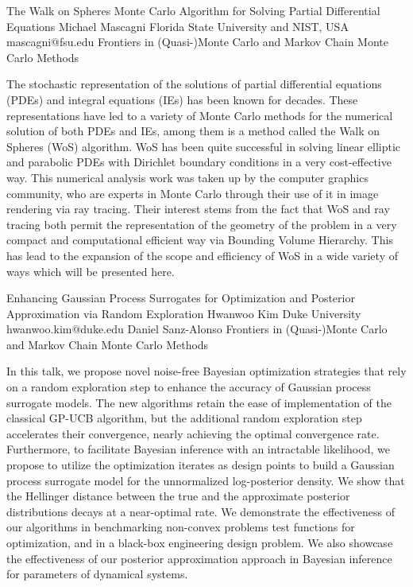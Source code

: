 \begin{talk}
  {The Walk on Spheres Monte Carlo Algorithm for Solving Partial Differential Equations}%
  {Michael Mascagni}%
  {Florida State University and NIST, USA}%
  {mascagni@fsu.edu}%
  {}%
  {Frontiers in (Quasi-)Monte Carlo and Markov Chain Monte Carlo Methods}%
    
   
The stochastic representation of the solutions of partial differential equations (PDEs) and integral equations (IEs) has been known for decades.  These representations have led to a variety of Monte Carlo methods for the numerical solution of both PDEs and IEs, among them is a method called the Walk on Spheres (WoS) algorithm.  WoS has been quite successful in solving linear elliptic and parabolic PDEs with Dirichlet boundary conditions in a very cost-effective way.  This numerical analysis work was taken up by the computer graphics community, who are experts in Monte Carlo through their use of it in image rendering via ray tracing.  Their interest stems from the fact that WoS and ray tracing both permit the representation of the geometry of the problem in a very compact and computational efficient way via Bounding Volume Hierarchy.  This has lead to the expansion of the scope and efficiency of WoS in a wide variety of ways which will be presented here.
\end{talk}

\begin{talk}
  {Enhancing Gaussian Process Surrogates for Optimization and Posterior Approximation via Random Exploration}%
  {Hwanwoo Kim}%
  {Duke University}%
  {hwanwoo.kim@duke.edu}%
  {Daniel Sanz-Alonso}%
  {Frontiers in (Quasi-)Monte Carlo and Markov Chain Monte Carlo Methods}%
    
   
In this talk, we propose novel noise-free Bayesian optimization strategies that rely on a random exploration step to enhance the accuracy of Gaussian process surrogate models. The new algorithms retain the ease of implementation of the classical GP-UCB algorithm, but the additional random exploration step accelerates their convergence, nearly achieving the optimal convergence rate. Furthermore, to facilitate Bayesian inference with an intractable likelihood, we propose to utilize the optimization iterates as design points to build a Gaussian process surrogate model for the unnormalized log-posterior density. We show that the Hellinger distance between the true and the approximate posterior distributions decays at a near-optimal rate. We demonstrate the effectiveness of our algorithms in benchmarking non-convex problems test functions for optimization, and in a black-box engineering design problem. We also showcase the effectiveness of our posterior approximation approach in Bayesian inference for parameters of dynamical systems.


\end{talk}
